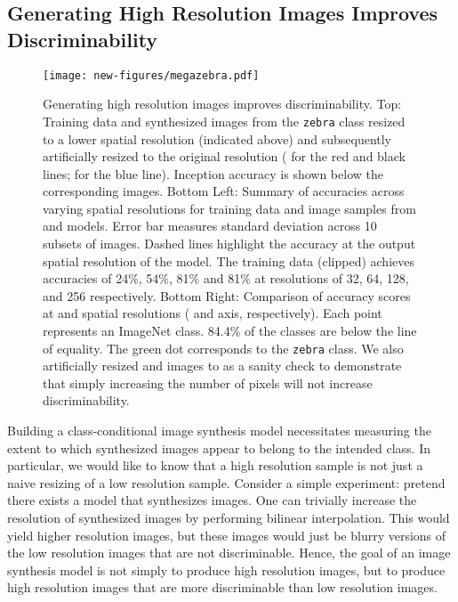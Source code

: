 \documentclass{article}
\begin{document}
\subsection{Generating High Resolution Images Improves Discriminability} \label{section:resolution}

\begin{figure*}[t]
\texttt{[image: new-figures/megazebra.pdf]}
\centering
\caption{Generating high resolution images improves discriminability. Top: Training data 
and synthesized images from the {\tt zebra} class resized to a lower spatial
resolution (indicated above) and subsequently artificially resized to the original resolution ( for the red and black lines;  for the blue line).
Inception accuracy is shown below the corresponding images.
Bottom Left:
Summary of accuracies across varying spatial resolutions for training data and image samples
from  and  models.
Error bar measures standard deviation across 10 subsets of images.
Dashed lines highlight the accuracy at the output spatial resolution of the model.
The training data (clipped) achieves accuracies of 24\%, 54\%, 81\% and 81\% at resolutions of
32, 64, 128, and 256 respectively.
Bottom Right:
Comparison of accuracy scores at  and  spatial resolutions ( and  axis, respectively).
Each point represents an ImageNet class.
84.4\% of the classes are below the line of equality.
The green dot corresponds to the {\tt zebra} class.
We also artificially resized  and  images to  as a sanity check
to demonstrate that simply increasing the number of pixels will not increase discriminability.}


\label{fig:inception_score_plot}
\end{figure*}

Building a class-conditional image synthesis model
necessitates measuring the extent to which synthesized images
appear to belong to the intended class.
In particular, we would like to know that a high resolution sample
is not just a naive resizing of a low resolution sample.
Consider a simple experiment: pretend there exists a model that synthesizes
 images.
One can trivially increase the resolution of synthesized images
by performing bilinear interpolation.
This would yield higher resolution images, but these images would just be blurry
versions of the low resolution images that are not discriminable.
Hence, the goal of an image synthesis model is not simply to produce high resolution images,
but to produce high resolution images that are more discriminable than low resolution images.
\end{document}
